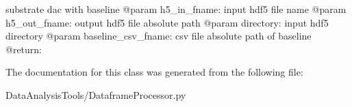 \begin{DoxyVerb}substrate dac with baseline
@param h5_in_fname: input hdf5 file name
@param h5_out_fname: output hdf5 file absolute path
@param directory: input hdf5 directory
@param baseline_csv_fname: csv file absolute path of baseline
@return:
\end{DoxyVerb}
 

The documentation for this class was generated from the following file\+:\begin{DoxyCompactItemize}
\item 
Data\+Analysis\+Tools/Dataframe\+Processor.\+py\end{DoxyCompactItemize}
